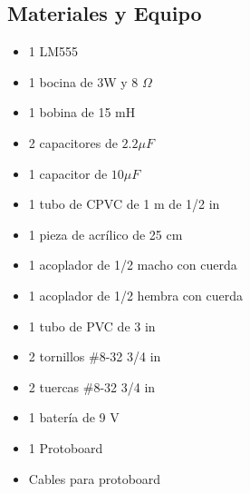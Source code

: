 \subsection{Materiales y Equipo}
\begin{multicols}{2}
\begin{itemize}
 \item 1 LM555
 \item 1 bocina de 3W y 8 $\Omega$
 \item 1 bobina de 15 mH
 \item 2 capacitores de $2.2 \mu F$
 \item 1 capacitor de $10 \mu F$
 \item 1 tubo de CPVC de 1 m de 1/2 in
 \item 1 pieza de acr\'ilico de 25 cm
 \item 1 acoplador de 1/2 macho con cuerda
 \item 1 acoplador de 1/2 hembra con cuerda
 \item 1 tubo de PVC de 3 in 
 \item 2 tornillos \#8-32 3/4 in
 \item 2 tuercas \#8-32 3/4 in
 \item 1 bater\'ia de 9 V
 \item 1 Protoboard
 \item Cables para protoboard
\end{itemize}
\end{multicols}
